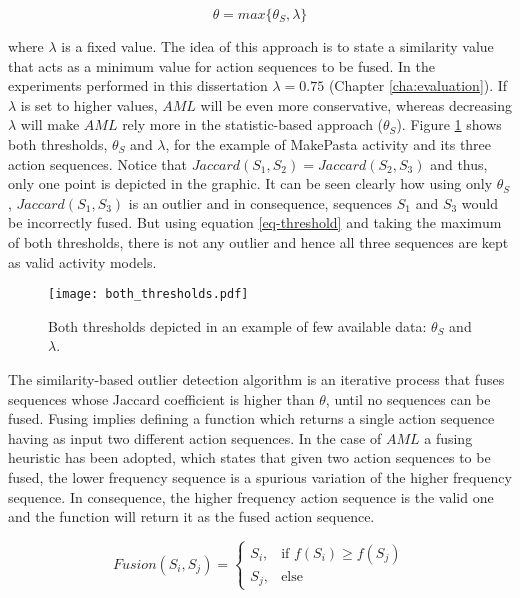 \begin{equation}
\label{eq-threshold}
 \theta = max \{ \theta_S, \lambda \}
\end{equation}

\noindent where $\lambda$ is a fixed value. The idea of this approach is to state a similarity value that acts as a minimum value for action sequences to be fused. In the experiments performed in this dissertation $\lambda = 0.75$ (Chapter \ref{cha:evaluation}). If $\lambda$ is set to higher values, $AML$ will be even more conservative, whereas decreasing $\lambda$ will make $AML$ rely more in the statistic-based approach ($\theta_S$). Figure \ref{fig-both-thresholds} shows both thresholds, $\theta_S$ and $\lambda$, for the example of MakePasta activity and its three action sequences. Notice that $Jaccard(S_1, S_2) = Jaccard(S_2, S_3)$ and thus, only one point is depicted in the graphic. It can be seen clearly how using only $\theta_S$, $Jaccard(S_1, S_3)$ is an outlier and in consequence, sequences $S_1$ and $S_3$ would be incorrectly fused. But using equation \ref{eq-threshold} and taking the maximum of both thresholds, there is not any outlier and hence all three sequences are kept as valid activity models. 

\begin{figure}[htbp]
\centering
\texttt{[image: both\_thresholds.pdf]}
    \caption{Both thresholds depicted in an example of few available data: $\theta_S$ and $\lambda$.}
    \label{fig-both-thresholds}
\end{figure}

The similarity-based outlier detection algorithm is an iterative process that fuses sequences whose Jaccard coefficient is higher than $\theta$, until no sequences can be fused. Fusing implies defining a function which returns a single action sequence having as input two different action sequences. In the case of $AML$ a fusing heuristic has been adopted, which states that given two action sequences to be fused, the lower frequency sequence is a spurious variation of the higher frequency sequence. In consequence, the higher frequency action sequence is the valid one and the function will return it as the fused action sequence. 

\begin{equation}
\label{eq-fusion}
 Fusion(S_i, S_j) = \left\{
\begin{array}{cc}
 S_i, & \mbox{if } f(S_i) \geq f(S_j) \\
 S_j, & \mbox{else}
\end{array}
\right.
\end{equation}

